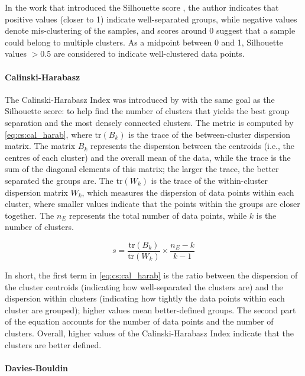 In the work that introduced the Silhouette score \citep{Rousseeuw1987-wy}, the author indicates that positive values (closer to 1) indicate well-separated groups, while negative values denote mis-clustering of the samples, and scores around 0 suggest that a sample could belong to multiple clusters. As a midpoint between 0 and 1, Silhouette values \(>\)0.5 are considered to indicate well-clustered data points.


\paragraph*{Calinski-Harabasz} \label{s:lit:cal_harab}


The Calinski-Harabasz Index was introduced by \citet{Calinski1974-uu} with the same goal as the Silhouette score: to help find the number of clusters that yields the best group separation and the most densely connected clusters. The metric is computed by \cref{eq:cs:cal_harab}, where \(\mathrm{tr}(B_k)\) is the trace of the between-cluster dispersion matrix. The matrix \(B_k\) represents the dispersion between the centroids (i.e., the centres of each cluster) and the overall mean of the data, while the trace is the sum of the diagonal elements of this matrix; the larger the trace, the better separated the groups are. The \(\mathrm{tr}(W_k)\) is the trace of the within-cluster dispersion matrix \(W_k\), which measures the dispersion of data points within each cluster, where smaller values indicate that the points within the groups are closer together. The \(n_E\) represents the total number of data points, while \(k\) is the number of clusters.

\begin{equation} \label{eq:cs:cal_harab}
    s = \frac{\mathrm{tr}(B_k)}{\mathrm{tr}(W_k)} \times \frac{n_E - k}{k - 1}
\end{equation}

In short, the first term in \cref{eq:cs:cal_harab} is the ratio between the dispersion of the cluster centroids (indicating how well-separated the clusters are) and the dispersion within clusters (indicating how tightly the data points within each cluster are grouped); higher values mean better-defined groups. The second part of the equation accounts for the number of data points and the number of clusters. Overall, higher values of the Calinski-Harabasz Index indicate that the clusters are better defined.


\paragraph*{Davies-Bouldin} \label{s:lit:davies_bouldin}

